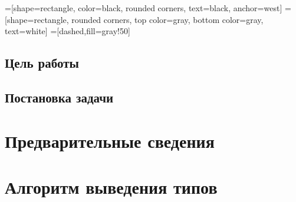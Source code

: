 


    =[shape=rectangle, color=black, rounded corners,%
    text=black, anchor=west]
    =[shape=rectangle, rounded corners,%
    top color=gray,%
    bottom color=gray, text=white]
    =[dashed,fill=gray!50]



\Intro
\section*{Цель работы}
\section*{Постановка задачи}

\chapter{Предварительные сведения}

\chapter{Алгоритм выведения типов}
